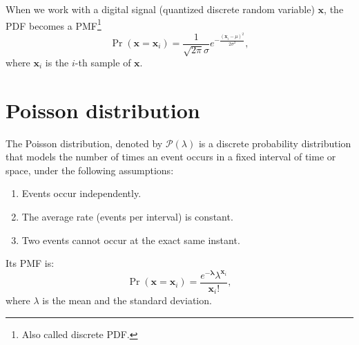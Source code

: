 When we work with a digital signal (quantized discrete random
variable) $\mathbf{x}$, the \gls{PDF} becomes a
\gls{PMF}\footnote{Also called discrete \gls{PDF}.}
\begin{equation}
  \Pr(\mathbf{x}{=}\mathbf{x}_i) = \frac{1}{\sqrt{2\pi}\sigma} e^{-\frac{(\mathbf{x}_i-\mu)^2}{2\sigma^2} },
  \label{eq:normal_PMD}
\end{equation}
where $\mathbf{x}_i$ is the $i$-th sample of $\mathbf{x}$.


\section{Poisson distribution}

The Poisson distribution, denoted by $\mathcal{P}(\lambda)$ is a
discrete probability distribution that models the number of times an
event occurs in a fixed interval of time or space, under the following
assumptions:
\begin{enumerate}
\item Events occur independently.
\item The average rate (events per interval) is constant.
\item Two events cannot occur at the exact same instant.
\end{enumerate}
Its \gls{PMF} is:
\begin{equation}
  \Pr(\mathbf{x}{=}\mathbf{x}_i) = \frac{e^{-\mathbf{\lambda}}\lambda^{\mathbf{x}_i}}{\mathbf{x}_i!},
  \label{eq:PN}
\end{equation}
where $\lambda$ is the mean and the standard deviation.




